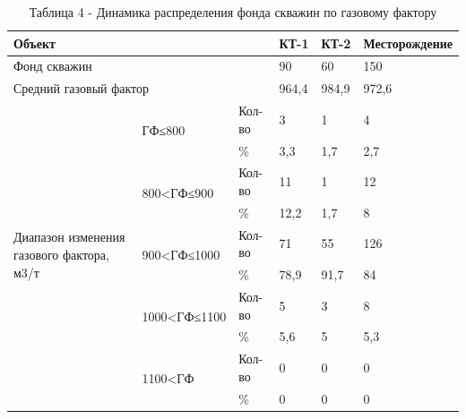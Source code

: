 \begin{table}[H]
\caption*{Таблица 4 - Динамика распределения фонда скважин по газовому фактору}
\centering
\begin{tabular}{|lll|l|l|l|}
\hline
\multicolumn{3}{|l|}{Объект} & КТ-1 & КТ-2 & Месторождение \\ \hline
\multicolumn{3}{|l|}{Фонд скважин} & 90 & 60 & 150 \\ \hline
\multicolumn{3}{|l|}{Средний газовый фактор} & 964,4 & 984,9 & 972,6 \\ \hline
\multicolumn{1}{|p{0.2\textwidth}|}{\multirow{10}{=}{Диапазон изменения газового фактора, м3/т}} & \multicolumn{1}{l|}{\multirow{2}{*}{ГФ≤800}} & Кол-во & 3 & 1 & 4 \\ \cline{3-6} 
\multicolumn{1}{|l|}{} & \multicolumn{1}{l|}{} & \% & 3,3 & 1,7 & 2,7 \\ \cline{2-6} 
\multicolumn{1}{|l|}{} & \multicolumn{1}{l|}{\multirow{2}{*}{800<ГФ≤900}} & Кол-во & 11 & 1 & 12 \\ \cline{3-6} 
\multicolumn{1}{|l|}{} & \multicolumn{1}{l|}{} & \% & 12,2 & 1,7 & 8 \\ \cline{2-6} 
\multicolumn{1}{|l|}{} & \multicolumn{1}{l|}{\multirow{2}{*}{900<ГФ≤1000}} & Кол-во & 71 & 55 & 126 \\ \cline{3-6} 
\multicolumn{1}{|l|}{} & \multicolumn{1}{l|}{} & \% & 78,9 & 91,7 & 84 \\ \cline{2-6} 
\multicolumn{1}{|l|}{} & \multicolumn{1}{l|}{\multirow{2}{*}{1000<ГФ≤1100}} & Кол-во & 5 & 3 & 8 \\ \cline{3-6} 
\multicolumn{1}{|l|}{} & \multicolumn{1}{l|}{} & \% & 5,6 & 5 & 5,3 \\ \cline{2-6} 
\multicolumn{1}{|l|}{} & \multicolumn{1}{l|}{\multirow{2}{*}{1100<ГФ}} & Кол-во & 0 & 0 & 0 \\ \cline{3-6} 
\multicolumn{1}{|l|}{} & \multicolumn{1}{l|}{} & \% & 0 & 0 & 0 \\ \hline
\end{tabular}
\end{table}


